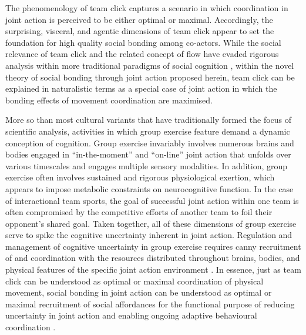 \begin{CJK}{UTF8}{gbsn}
The phenomenology of team click captures a scenario in which coordination in joint action is perceived to be either optimal or maximal.  Accordingly, the surprising, visceral, and agentic dimensions of team click appear to set the foundation for high quality social bonding among co-actors.  While the social relevance of team click and the related concept of flow have evaded rigorous analysis within more traditional paradigms of social cognition \citep[for explanations as to why, see][]{Dietrich2004,Slingerland2014}, within the novel theory of social bonding through joint action proposed herein, team click can be explained in naturalistic terms as a special case of joint action in which the bonding effects of movement coordination are maximised.

More so than most cultural variants that have traditionally formed the focus of scientific analysis, activities in which group exercise feature demand a dynamic conception of cognition.  Group exercise invariably involves numerous brains and bodies engaged in ``in-the-moment'' and ``on-line'' joint action that unfolds over various timescales and engages multiple sensory modalities. In addition, group exercise often involves sustained and rigorous physiological exertion, which appears to impose metabolic constraints on neurocognitive function.  In the case of interactional team sports, the goal of successful joint action within one team is often compromised by the competitive efforts of another team to foil their opponent's shared goal.  Taken together, all of these dimensions of group exercise serve to spike the cognitive uncertainty inherent in joint action.  Regulation and management of cognitive uncertainty in group exercise requires canny recruitment of and coordination with the resources distributed throughout brains, bodies, and physical features of the specific joint action environment \citep{Clark2015}.  In essence, just as team click can be understood as optimal or maximal coordination of physical movement, social bonding in joint action can be understood as optimal or maximal recruitment of social affordances for the functional purpose of reducing uncertainty in joint action and enabling ongoing adaptive behavioural coordination \citep{Ramstead2016}.


\end{CJK}
